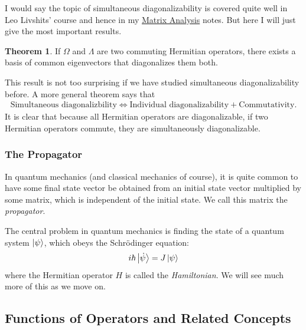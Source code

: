 \documentclass{book}
\theoremstyle{definition}
\newtheorem{thm}{Theorem}[section]
\begin{document}
I would say the topic of simultaneous diagonalizability is covered quite well in Leo Livshits' course and hence in my \href{https://huanqbui.com/LaTeX\%20projects/Matrix_Analysis/HuanBui_MatrixAnalysis.pdf}{Matrix Analysis} notes. But here I will just give the most important results. 

\begin{thm}
	If $\Omega$ and $\Lambda$ are two commuting Hermitian operators, there exists a basis of common eigenvectors that diagonalizes them both. 
\end{thm} 

This result is not too surprising if we have studied simultaneous diagonalizability before. A more general theorem says that 
\begin{align}
\text{Simultaneous diagonalizbility} \iff \text{Individual diagonalizability} + \text{Commutativity}.
\end{align}
It is clear that because all Hermitian operators are diagonalizable, if two Hermitian operators commute, they are simultaneously diagonalizable.



\subsubsection{The Propagator}

In quantum mechanics (and classical mechanics of course), it is quite common to have some final state vector be obtained from an initial state vector multiplied by some matrix, which is independent of the initial state. We call this matrix the \textit{propagator}. 


The central problem in quantum mechanics is finding the state of a quantum system $\ket{\psi}$, which obeys the Schr\"{o}dinger equation:
\begin{align}
i\hbar \ket{\dot{\psi}} = J\ket{\psi}
\end{align}
where the Hermitian operator $H$ is called the \textit{Hamiltonian}. We will see much more of this as we move on.



\subsection{Functions of Operators and Related Concepts}
\end{document}
